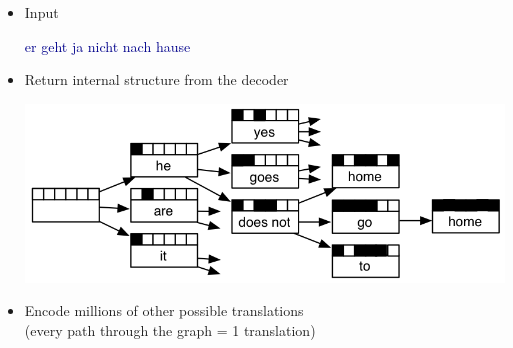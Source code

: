 \documentclass[landscape]{uedslides2C}
\newcommand{\example}[1]{\textcolor{darkblue}{\rm #1}}
\begin{document}

\begin{itemize}
\item  Input \vspace{-10mm}
\begin{center}
\example{er geht ja nicht nach hause}
\end{center}

\item Return internal structure from the decoder \vspace{-5mm}
\begin{center}
\includegraphics[scale=1.2]{search-graph.png}
\end{center}

\item Encode millions of other possible translations\\
(every path through the graph = 1 translation)

\end{itemize}


%
%  
\end{document}
